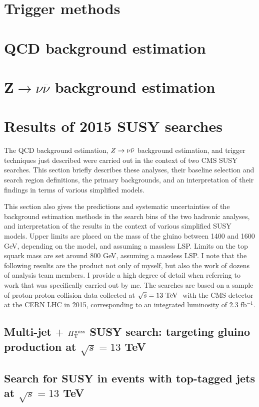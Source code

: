\section{Trigger methods}
\label{sec:anatrig}


\section{QCD background estimation}
\label{sec:qcd}


\section{Z$\rightarrow\nu\bar{\nu}$ background estimation}
\label{sec:zinv}




\section{Results of 2015 SUSY searches}
\label{sec:2015results}
The QCD background estimation, $Z\rightarrow \nu\bar{\nu}$ background estimation, and trigger techniques just described were carried out in the context of two CMS SUSY searches. This section briefly describes these analyses, their baseline selection and search region definitions, the primary backgrounds, and an interpretation of their findings in terms of various simplified models. 

This section also gives the predictions and systematic uncertainties of the background estimation methods in the search bins of the two hadronic analyses, and interpretation of the results in the context of various simplified SUSY models. Upper limits are placed on the mass of the gluino between 1400 and 1600 GeV, depending on the model, and assuming a massless LSP. Limits on the top squark mass are set around 800 GeV, assuming a massless LSP. I note that the following results are the product not only of myself, but also the work of dozens of analysis team members. I provide a high degree of detail when referring to work that was specifically carried out by me. The searches are based on a sample of proton-proton collision data collected at $\sqrt{s}=13~\text{TeV}~$ with the CMS detector at the CERN LHC in 2015, corresponding to an integrated luminosity of 2.3 fb$^{-1}$.

\subsection{Multi-jet $+$ $H_{\text{T}}^{\rm miss}$ SUSY search: targeting gluino production at $\sqrt{s}=13$ TeV}
\label{sec:ra2b2015}

\FloatBarrier

\subsection{Search for SUSY in events with top-tagged jets at $\sqrt{s}=13$ TeV}
\label{sec:hadstop2015}


\FloatBarrier

